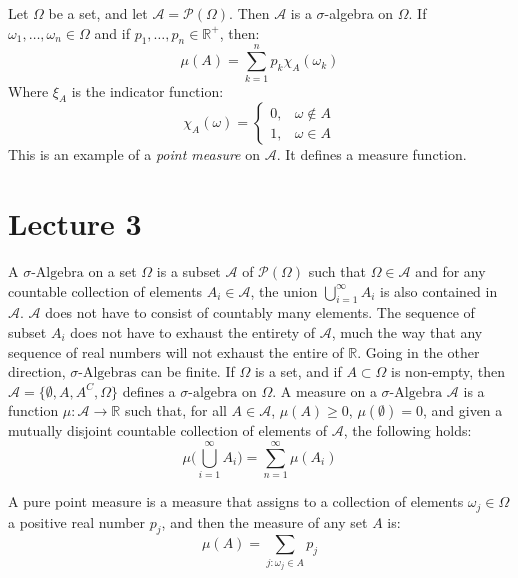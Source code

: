 \documentclass[crop=false,class=book,oneside]{standalone}
\begin{document}
            \begin{example}
                Let $\Omega$ be a set, and let
                $\mathcal{A}=\mathcal{P}(\Omega)$. Then
                $\mathcal{A}$ is a $\sigma$-algebra on $\Omega$.
                If $\omega_{1},\hdots,\omega_{n}\in\Omega$ and if
                $p_{1},\hdots,p_{n}\in\mathbb{R}^{+}$, then:
                \begin{equation}
                    \mu(A)=\sum_{k=1}^{n}p_{k}\chi_{A}(\omega_{k})
                \end{equation}
                Where $\xi_{A}$ is the indicator function:
                \begin{equation}
                    \chi_{A}(\omega)=
                    \begin{cases}
                        0,&\omega\notin{A}\\
                        1,&\omega\in{A}
                    \end{cases}
                \end{equation}
                This is an example of a \textit{point measure}
                on $\mathcal{A}$. It defines a measure function.
            \end{example}
    \section{Lecture 3}
        A $\sigma\text{-Algebra}$ on a set $\Omega$ is a subset
        $\mathcal{A}$ of $\mathcal{P}(\Omega)$ such that
        $\Omega\in\mathcal{A}$ and for any countable collection of
        elements $A_{i}\in\mathcal{A}$, the union
        $\bigcup_{i=1}^{\infty}A_{i}$ is also contained in
        $\mathcal{A}$. $\mathcal{A}$ does not have to consist of
        countably many elements. The sequence of subset $A_{i}$ does
        not have to exhaust the entirety of $\mathcal{A}$, much the
        way that any sequence of real numbers will not exhaust the
        entire of $\mathbb{R}$. Going in the other direction,
        $\sigma\text{-Algebras}$ can be finite. If $\Omega$ is a
        set, and if $A\subset\Omega$ is non-empty, then
        $\mathcal{A}=\{\emptyset,A,A^{C},\Omega\}$ defines a
        $\sigma\text{-algebra}$ on $\Omega$. A measure on a
        $\sigma\text{-Algebra}$ $\mathcal{A}$ is a function
        $\mu:\mathcal{A}\rightarrow\mathbb{R}$ such that, for all
        $A\in\mathcal{A}$, $\mu(A)\geq{0}$, $\mu(\emptyset)=0$, and
        given a mutually disjoint countable collection of elements of
        $\mathcal{A}$, the following holds:
        \begin{equation}
            \mu\Big(\bigcup_{i=1}^{\infty}A_{i}\Big)
            =\sum_{n=1}^{\infty}\mu(A_{i})
        \end{equation}
        \begin{example}
            A pure point measure is a measure that assigns to a
            collection of elements $\omega_{j}\in\Omega$ a positive
            real number $p_{j}$, and then the measure of any set
            $A$ is:
            \begin{equation}
                \mu(A)=\sum_{j:\omega_{j}\in{A}}p_{j}
            \end{equation}
        \end{example}
\end{document}
